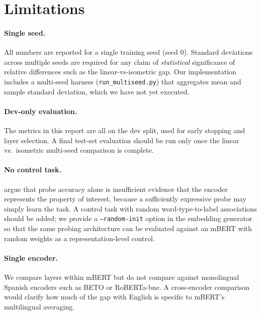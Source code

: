 \documentclass[11pt,a4paper]{article}
\begin{document}
\section{Limitations}
\label{sec:limitations}

\paragraph{Single seed.} All numbers are reported for a single
training seed (seed 0). Standard deviations across multiple seeds are
required for any claim of \emph{statistical} significance of
relative differences such as the linear-vs-isometric gap. Our
implementation includes a multi-seed harness (\texttt{run\_multiseed.py})
that aggregates mean and sample standard deviation, which we have not
yet executed.

\paragraph{Dev-only evaluation.} The metrics in this report are all
on the dev split, used for early stopping and layer selection. A
final test-set evaluation should be run only once the linear vs.\
isometric multi-seed comparison is complete.

\paragraph{No control task.} \citet{hewitt2019control} argue that
probe accuracy alone is insufficient evidence that the encoder
represents the property of interest, because a sufficiently expressive
probe may simply learn the task. A control task with random
word-type-to-label associations should be added; we provide a
\texttt{--random-init} option in the embedding generator so that the
same probing architecture can be evaluated against an mBERT with
random weights as a representation-level control.

\paragraph{Single encoder.} We compare layers within mBERT but do not
compare against monolingual Spanish encoders such as BETO or
RoBERTa-bne. A cross-encoder comparison would clarify how much of the
gap with English is specific to mBERT's multilingual averaging.

\end{document}
